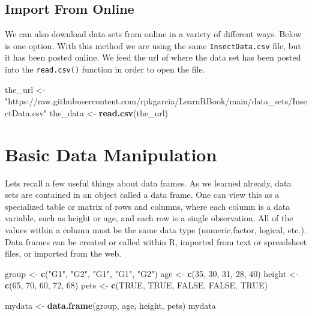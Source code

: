\documentclass[
]{book}
\newenvironment{Shaded}{\begin{snugshade}}{\end{snugshade}}
\newcommand{\DecValTok}[1]{\textcolor[rgb]{0.00,0.00,0.81}{#1}}
\newcommand{\KeywordTok}[1]{\textcolor[rgb]{0.13,0.29,0.53}{\textbf{#1}}}
\newcommand{\NormalTok}[1]{#1}
\newcommand{\OtherTok}[1]{\textcolor[rgb]{0.56,0.35,0.01}{#1}}
\newcommand{\StringTok}[1]{\textcolor[rgb]{0.31,0.60,0.02}{#1}}
\begin{document}
\hypertarget{import-from-online}{%
\subsection*{Import From Online}\label{import-from-online}}

We can also download data sets from online in a variety of different ways. Below is one option. With this method we are using the same \texttt{InsectData.csv} file, but it has been posted online. We feed the url of where the data set has been posted into the \texttt{read.csv()} function in order to open the file.

\begin{Shaded}
\begin{Highlighting}[]
\NormalTok{the_url <-}\StringTok{ "https://raw.githubusercontent.com/rpkgarcia/LearnRBook/main/data_sets/InsectData.csv"}
\NormalTok{the_data <-}\StringTok{ }\KeywordTok{read.csv}\NormalTok{(the_url)}
\end{Highlighting}
\end{Shaded}

\hypertarget{basic-data-manipulation}{%
\section{Basic Data Manipulation}\label{basic-data-manipulation}}

Lets recall a few useful things about data frames. As we learned already, data sets are contained in an object called a data frame. One can view this as a specialized table or matrix of rows and columns, where each column is a data variable, such as height or age, and each row is a single observation. All of the values within a column must be the same data type (numeric,factor, logical, etc.). Data frames can be created or called within R, imported from text or spreadsheet files, or imported from the web.

\begin{Shaded}
\begin{Highlighting}[]
\NormalTok{group <-}\StringTok{ }\KeywordTok{c}\NormalTok{(}\StringTok{"G1"}\NormalTok{, }\StringTok{"G2"}\NormalTok{,}
    \StringTok{"G1"}\NormalTok{, }\StringTok{"G1"}\NormalTok{, }\StringTok{"G2"}\NormalTok{)}
\NormalTok{age <-}\StringTok{ }\KeywordTok{c}\NormalTok{(}\DecValTok{35}\NormalTok{, }\DecValTok{30}\NormalTok{, }\DecValTok{31}\NormalTok{,}
    \DecValTok{28}\NormalTok{, }\DecValTok{40}\NormalTok{)}
\NormalTok{height <-}\StringTok{ }\KeywordTok{c}\NormalTok{(}\DecValTok{65}\NormalTok{, }\DecValTok{70}\NormalTok{, }\DecValTok{60}\NormalTok{,}
    \DecValTok{72}\NormalTok{, }\DecValTok{68}\NormalTok{)}
\NormalTok{pets <-}\StringTok{ }\KeywordTok{c}\NormalTok{(}\OtherTok{TRUE}\NormalTok{, }\OtherTok{TRUE}\NormalTok{,}
    \OtherTok{FALSE}\NormalTok{, }\OtherTok{FALSE}\NormalTok{, }\OtherTok{TRUE}\NormalTok{)}

\NormalTok{mydata <-}\StringTok{ }\KeywordTok{data.frame}\NormalTok{(group,}
\NormalTok{    age, height, pets)}
\NormalTok{mydata}
\end{Highlighting}
\end{Shaded}
\end{document}
